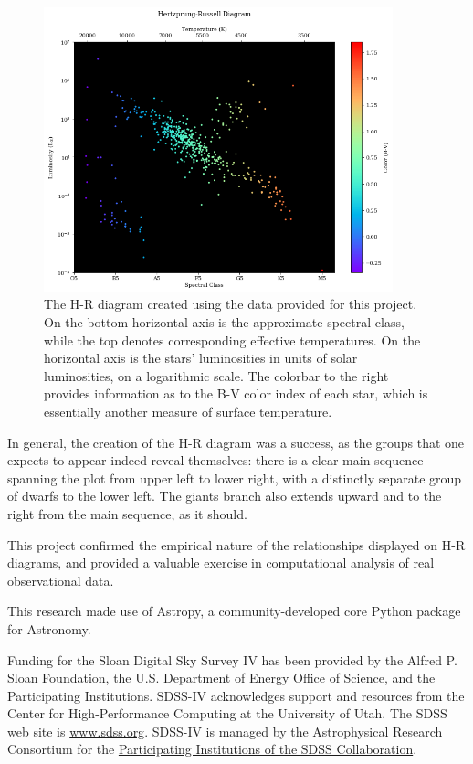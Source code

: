 \documentclass[twocolumn]{aastex63}
\begin{document}
\begin{figure}[!h]
  \includegraphics[width=0.9\textwidth]{diagram.png}
  \caption{The H-R diagram created using the data provided for this project. On the bottom horizontal axis is the approximate spectral class, while the top denotes corresponding effective temperatures. On the horizontal axis is the stars' luminosities in units of solar luminosities, on a logarithmic scale. The colorbar to the right provides information as to the B-V color index of each star, which is essentially another measure of surface temperature.}
  \label{fig:HRdiagram}
\end{figure}

In general, the creation of the H-R diagram was a success, as the groups that one expects to appear indeed reveal themselves: there is a clear main sequence spanning the plot from upper left to lower right, with a distinctly separate group of dwarfs to the lower left. The giants branch also extends upward and to the right from the main sequence, as it should.

This project confirmed the empirical nature of the relationships displayed on H-R diagrams, and provided a valuable exercise in computational analysis of real observational data.

\acknowledgments

This research made use of Astropy, a community-developed core Python package for Astronomy.

Funding for the Sloan Digital Sky Survey IV has been provided by the Alfred P. Sloan Foundation, the U.S. Department of Energy Office of Science, and the Participating Institutions. SDSS-IV acknowledges support and resources from the Center for High-Performance Computing at the University of Utah. The SDSS web site is \url{www.sdss.org}. SDSS-IV is managed by the Astrophysical Research Consortium for the \href{https://www.sdss.org/collaboration/affiliations/}{Participating Institutions of the SDSS Collaboration}.
\end{document}
